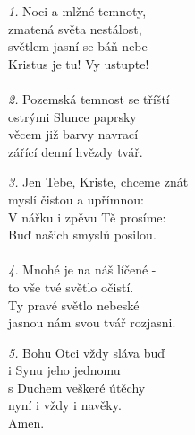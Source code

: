 \begin{translatioMulticol}{3}
{\color{red}\textit{1.}} Noci a mlžné temnoty,\\
zmatená světa nestálost,\\
světlem jasní se báň nebe\\
Kristus je tu! Vy ustupte!\\
\\
{\color{red}\textit{2.}} Pozemská temnost se tříští\\
ostrými Slunce paprsky\\
věcem již barvy navrací\\
zářící denní hvězdy tvář.\columnbreak

{\color{red}\textit{3.}} Jen Tebe, Kriste, chceme znát\\
myslí čistou a upřímnou:\\
V nářku i zpěvu Tě prosíme:\\
Buď našich smyslů posilou.\\
\\
{\color{red}\textit{4.}} Mnohé je na náš líčené -\\
to vše tvé světlo očistí.\\
Ty pravé světlo nebeské\\
jasnou nám svou tvář rozjasni.\columnbreak

{\color{red}\textit{5.}} Bohu Otci vždy sláva buď\\
i Synu jeho jednomu\\
s Duchem veškeré útěchy\\
nyní i vždy i navěky.\\
Amen.
\end{translatioMulticol}
